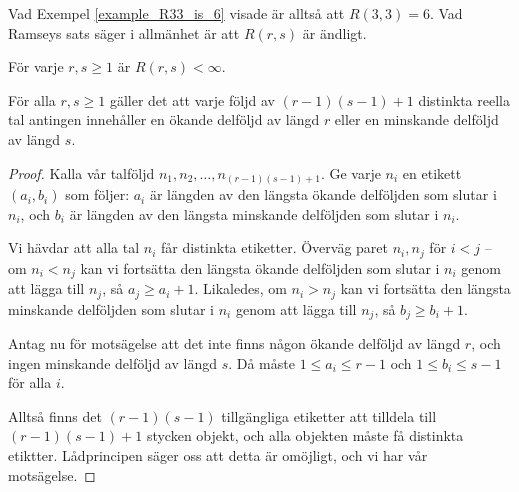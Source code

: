\documentclass[nobib]{tufte-handout}
\begin{document}
Vad Exempel \ref{example_R33_is_6} visade är alltså att $R(3,3) = 6$. Vad Ramseys sats säger i allmänhet är att $R(r,s)$ är ändligt.

\begin{theorem}\label{ramseys_theorem}
  För varje $r, s \geq 1$ är $R(r,s) < \infty$.
\end{theorem}

\begin{theorem}
  För alla $r,s \geq 1$ gäller det att varje följd av $(r-1)(s-1) + 1$ distinkta reella tal antingen innehåller en ökande delföljd av längd $r$ eller en minskande delföljd av längd $s$.

  \begin{proof}
    Kalla vår talföljd $n_1, n_2, \ldots, n_{(r-1)(s-1)+1}$. Ge varje $n_i$ en etikett $(a_i, b_i)$ som följer: $a_i$ är längden av den längsta ökande delföljden som slutar i $n_i$, och $b_i$ är längden av den längsta minskande delföljden som slutar i $n_i$.

    Vi hävdar att alla tal $n_i$ får distinkta etiketter. Överväg paret $n_i, n_j$ för $i < j$ -- om $n_i < n_j$ kan vi fortsätta den längsta ökande delföljden som slutar i $n_i$ genom att lägga till $n_j$, så $a_j \geq a_i + 1$. Likaledes, om $n_i > n_j$ kan vi fortsätta den längsta minskande delföljden som slutar i $n_i$ genom att lägga till $n_j$, så $b_j \geq b_i + 1$.

    Antag nu för motsägelse att det inte finns någon ökande delföljd av längd $r$, och ingen minskande delföljd av längd $s$. Då måste $1 \leq a_i \leq r-1$ och $1\leq b_i \leq s-1$ för alla $i$.

    Alltså finns det $(r-1)(s-1)$ tillgängliga etiketter att tilldela till $(r-1)(s-1) + 1$ stycken objekt, och alla objekten måste få distinkta etiktter. Lådprincipen säger oss att detta är omöjligt, och vi har vår motsägelse.
  \end{proof}
\end{theorem}
\end{document}
